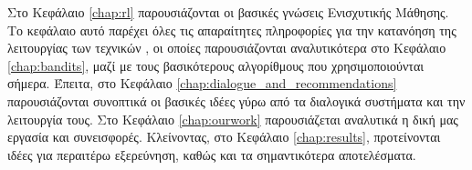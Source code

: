Στο Κεφάλαιο \ref{chap:rl} παρουσιάζονται οι βασικές γνώσεις Ενισχυτικής Μάθησης. Το κεφάλαιο αυτό παρέχει όλες τις απαραίτητες πληροφορίες για την κατανόηση της
λειτουργίας των τεχνικών , οι οποίες παρουσιάζονται αναλυτικότερα στο Κεφάλαιο \ref{chap:bandits}, μαζί με τους βασικότερους αλγορίθμους που χρησιμοποιούνται σήμερα.
Έπειτα, στο Κεφάλαιο \ref{chap:dialogue_and_recommendations} παρουσιάζονται συνοπτικά οι βασικές ιδέες γύρω από τα διαλογικά συστήματα και την λειτουργία τους. Στο Κεφάλαιο \ref{chap:ourwork}
παρουσιάζεται αναλυτικά η δική μας εργασία και συνεισφορές. Κλείνοντας, στο Κεφάλαιο \ref{chap:results}, προτείνονται ιδέες για περαιτέρω εξερεύνηση, καθώς και τα σημαντικότερα αποτελέσματα.
